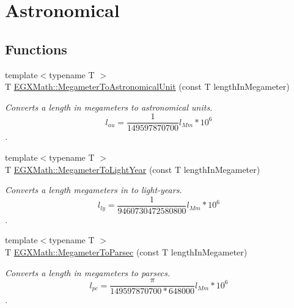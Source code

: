 \hypertarget{group___e_g_x_math-_conversions-_length_conversions-_s_i-_megameter-_astronomical}{}\section{Astronomical}
\label{group___e_g_x_math-_conversions-_length_conversions-_s_i-_megameter-_astronomical}
\subsection*{Functions}
\begin{DoxyCompactItemize}
\item 
{\footnotesize template$<$typename T $>$ }\\T \mbox{\hyperlink{group___e_g_x_math-_conversions-_length_conversions-_s_i-_megameter-_astronomical_gac7cc4e20e973762cb87a8934184cdf6d}{E\+G\+X\+Math\+::\+Megameter\+To\+Astronomical\+Unit}} (const T length\+In\+Megameter)
\begin{DoxyCompactList}\small\item\em Converts a length in megameters to astronomical units. \[ l_{au}= \frac{1}{149597870700} l_{Mm} * 10^{6} \]. \end{DoxyCompactList}\item 
{\footnotesize template$<$typename T $>$ }\\T \mbox{\hyperlink{group___e_g_x_math-_conversions-_length_conversions-_s_i-_megameter-_astronomical_ga6f5018465cf15f75912695e069b86795}{E\+G\+X\+Math\+::\+Megameter\+To\+Light\+Year}} (const T length\+In\+Megameter)
\begin{DoxyCompactList}\small\item\em Converts a length megameters in to light-\/years. \[ l_{ly}= \frac{1}{9460730472580800} l_{Mm} * 10^{6} \]. \end{DoxyCompactList}\item 
{\footnotesize template$<$typename T $>$ }\\T \mbox{\hyperlink{group___e_g_x_math-_conversions-_length_conversions-_s_i-_megameter-_astronomical_gaec774451afc484c6fa69d2cfcd3dbf06}{E\+G\+X\+Math\+::\+Megameter\+To\+Parsec}} (const T length\+In\+Megameter)
\begin{DoxyCompactList}\small\item\em Converts a length in megameters to parsecs. \[ l_{pc}=\frac{\pi}{149597870700 * 648000} l_{Mm} * 10^{6} \]. \end{DoxyCompactList}\end{DoxyCompactItemize}


